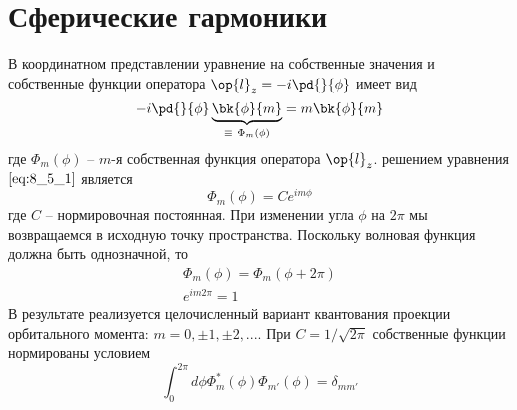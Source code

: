 \section{Сферические гармоники}

В координатном представлении уравнение на собственные значения и собственные функции оператора $\op{l}_z = -i \pd{}{\phi}$ имеет вид
\begin{equation}
\label{eq:8_5_1}
-i \pd{}{\phi} \underbrace{\bk{\phi}{m}}_{\equiv~\Phi_m(\phi)} = m \bk{\phi}{m}
\end{equation}%
%
где $\Phi_m(\phi)$ -- $m$-я собственная функция оператора $\op{l}_z$. решением уравнения $\eqref{eq:8_5_1}$ является
\begin{equation}
\label{eq:8_5_2}
  \Phi_m(\phi) = C e^{i m \phi}
\end{equation}%
%
где $C$ -- нормировочная постоянная. При изменении угла $\phi$ на $2\pi$ мы возвращаемся в исходную точку пространства. Поскольку волновая функция должна быть однозначной, то
$$
\begin{gathered}
\Phi_m(\phi) = \Phi_m(\phi + 2\pi) \\
e^{im2\pi} = 1
\end{gathered}
$$%
%
В результате реализуется целочисленный вариант квантования проекции орбитального момента: $m=0, \pm 1, \pm 2, ...$. При $C = 1/\sqrt{2\pi}$ собственные функции нормированы условием
$$
\int_0^{2\pi} d\phi \Phi^*_m(\phi) \Phi_{m'}(\phi) = \delta_{mm'} 
$$

